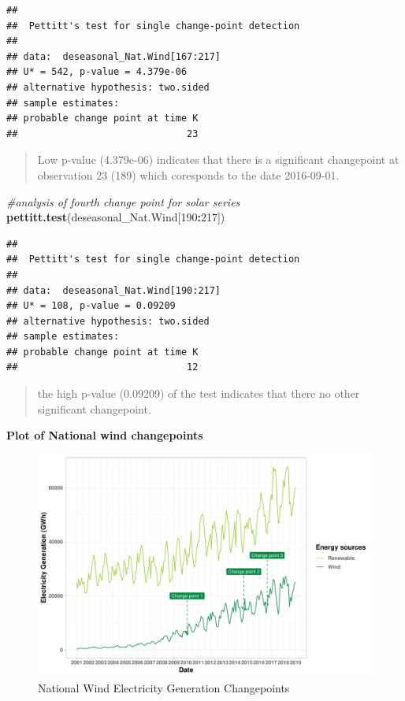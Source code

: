 \documentclass[12pt,]{article}
\newenvironment{Shaded}{\begin{snugshade}}{\end{snugshade}}
\newcommand{\KeywordTok}[1]{\textcolor[rgb]{0.13,0.29,0.53}{\textbf{#1}}}
\newcommand{\DecValTok}[1]{\textcolor[rgb]{0.00,0.00,0.81}{#1}}
\newcommand{\CommentTok}[1]{\textcolor[rgb]{0.56,0.35,0.01}{\textit{#1}}}
\newcommand{\OperatorTok}[1]{\textcolor[rgb]{0.81,0.36,0.00}{\textbf{#1}}}
\newcommand{\NormalTok}[1]{#1}
\begin{document}
\begin{verbatim}
## 
##  Pettitt's test for single change-point detection
## 
## data:  deseasonal_Nat.Wind[167:217]
## U* = 542, p-value = 4.379e-06
## alternative hypothesis: two.sided
## sample estimates:
## probable change point at time K 
##                              23
\end{verbatim}

\begin{quote}
Low p-value (4.379e-06) indicates that there is a significant
changepoint at observation 23 (189) which coresponds to the date
2016-09-01.
\end{quote}

\begin{Shaded}
\begin{Highlighting}[]
\CommentTok{#analysis of fourth change point for solar series}
\KeywordTok{pettitt.test}\NormalTok{(deseasonal_Nat.Wind[}\DecValTok{190}\OperatorTok{:}\DecValTok{217}\NormalTok{])}
\end{Highlighting}
\end{Shaded}

\begin{verbatim}
## 
##  Pettitt's test for single change-point detection
## 
## data:  deseasonal_Nat.Wind[190:217]
## U* = 108, p-value = 0.09209
## alternative hypothesis: two.sided
## sample estimates:
## probable change point at time K 
##                              12
\end{verbatim}

\begin{quote}
the high p-value (0.09209) of the test indicates that there no other
significant changepoint.
\end{quote}

\textbf{Plot of National wind changepoints}

\begin{figure}
\centering
\includegraphics{Kara_ENV872_Project_files/figure-latex/unnamed-chunk-35-1.pdf}
\caption{National Wind Electricity Generation Changepoints}
\end{figure}
\end{document}
